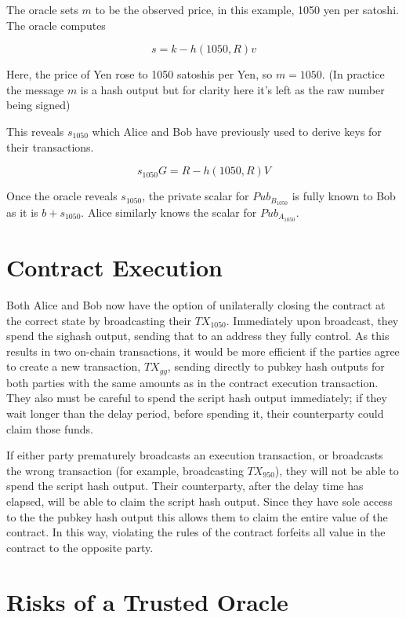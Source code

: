 \documentclass[11pt]{article}
\begin{document}
The oracle sets \(m\) to be the observed price, in this example, 1050 yen per satoshi.  The oracle computes

\[s = k - h(1050, R)v\]

Here, the price of Yen rose to 1050 satoshis per Yen, so \(m = 1050\).  (In practice the message \(m\) is a hash output but for clarity here it's left as the raw number being signed)


This reveals \(s_{1050}\) which Alice and Bob have previously used to derive keys for their transactions.

\[s_{1050}G = R - h(1050, R)V\]

Once the oracle reveals \(s_{1050}\), the private scalar for \(Pub_{B_{1050}}\) is fully known to Bob as it is \(b + s_{1050}\).  Alice similarly knows the scalar for \(Pub_{A_{1050}}\). 

\section*{Contract Execution}

Both Alice and Bob now have the option of unilaterally closing the contract at the correct state by broadcasting their \(TX_{1050}\).  Immediately upon broadcast, they spend the sighash output, sending that to an address they fully control.  As this results in two on-chain transactions, it would be more efficient if the parties agree to create a new transaction, \(TX_{gg}\), sending directly to pubkey hash outputs for both parties with the same amounts as in the contract execution transaction.  They also must be careful to spend the script hash output immediately; if they wait longer than the delay period, before spending it, their counterparty could claim those funds.

If either party prematurely broadcasts an execution transaction, or broadcasts the wrong transaction (for example, broadcasting \(TX_{950}\)), they will not be able to spend the script hash output.  Their counterparty, after the delay time has elapsed, will be able to claim the script hash output.  Since they have sole access to the the pubkey hash output this allows them to claim the entire value of the contract.  In this way, violating the rules of the contract forfeits all value in the contract to the opposite party.

\section*{Risks of a Trusted Oracle}
\end{document}
